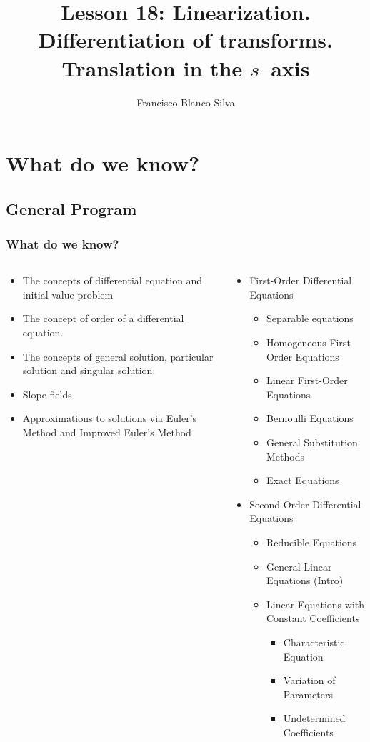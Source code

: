 \documentclass[9pt,xcolor=x11names,compress]{beamer}
\author[Francisco Blanco-Silva]{Francisco Blanco-Silva}
\institute[USC]{University of South Carolina}
\date{
\pgfdeclarelindenmayersystem{testrhombus}{
	\rule{F -> F+FF++FF+F+++F++F+++F}
}
\begin{tikzpicture}[color=DeepSkyBlue4]
    \draw [l-system={testrhombus, axiom=F+FF++FF+F+++F++F+++F, order=3, step=1.5pt, angle=90}]
    lindenmayer system; 
	\end{tikzpicture}	
}
\title{Lesson 18: Linearization. Differentiation of transforms. Translation in the $s$--axis}
\begin{document}
\frame{\titlepage}

\section{What do we know?}
\subsection{General Program}

\begin{frame}\frametitle{What do we know?}
\begin{columns}[T]
\begin{column}{0.45\linewidth}
\begin{itemize}
\item The concepts of \alert{differential equation} and \alert{initial value problem}
\item The concept of \alert{order} of a differential equation.
\item The concepts of \alert{general solution}, \alert{particular solution} and \alert{singular solution}.
\item \alert{Slope fields}
\item Approximations to solutions via \alert{Euler's Method} and \alert{Improved Euler's Method}
\end{itemize} 
\end{column}
\begin{column}{0.55\linewidth}
\begin{itemize}
\item First-Order Differential Equations
\begin{itemize}
\item Separable equations 
\item Homogeneous First-Order Equations 
\item Linear First-Order Equations 
\item Bernoulli Equations 
\item General Substitution Methods
\item Exact Equations 
\end{itemize}
\item Second-Order Differential Equations
\begin{itemize}
	\item Reducible Equations
	\item General Linear Equations (Intro)
	\item Linear Equations with Constant Coefficients
	\begin{itemize}
		\item Characteristic Equation
		\item Variation of Parameters
		\item Undetermined Coefficients
	\end{itemize}
\end{itemize}
\end{itemize}
\end{column}
\end{columns}
\end{frame}
\end{document}

